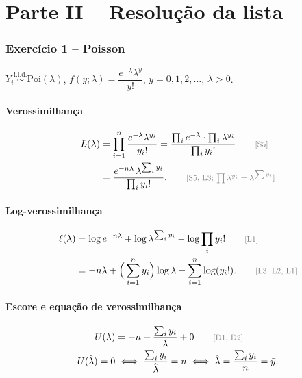 \documentclass[11pt,a4paper]{article}
\newcommand{\iid}{\overset{\text{i.i.d.}}{\sim}}
\newcommand{\just}[1]{\tag*{\footnotesize\textcolor{gray}{[#1]}}}
\theoremstyle{definition}
\theoremstyle{plain}
\begin{document}
\part*{Parte II -- Resolução da lista}
\setcounter{section}{0}

\section{Exercício 1 -- Poisson}

$Y_i\iid\text{Poi}(\lambda)$, $f(y;\lambda)=\dfrac{e^{-\lambda}\lambda^y}{y!}$, $y=0,1,2,\dots$, $\lambda>0$.

\subsection*{Verossimilhança}
\begin{align*}
L(\lambda)&=\prod_{i=1}^n\frac{e^{-\lambda}\lambda^{y_i}}{y_i!}
=\frac{\prod_ie^{-\lambda}\cdot\prod_i\lambda^{y_i}}{\prod_iy_i!} \just{S5}\\
&=\frac{e^{-n\lambda}\,\lambda^{\sum_iy_i}}{\prod_iy_i!}. \just{S5, L3; $\prod\lambda^{y_i}=\lambda^{\sum y_i}$}
\end{align*}

\subsection*{Log-verossimilhança}
\begin{align*}
\ell(\lambda)&=\log e^{-n\lambda}+\log\lambda^{\sum_iy_i}-\log\prod_iy_i! \just{L1}\\
&=-n\lambda+\Big(\sum_{i=1}^ny_i\Big)\log\lambda-\sum_{i=1}^n\log(y_i!). \just{L3, L2, L1}
\end{align*}

\subsection*{Escore e equação de verossimilhança}
\begin{align*}
U(\lambda)&=-n+\frac{\sum_iy_i}{\lambda}+0 \just{D1, D2}\\
U(\hat\lambda)=0&\iff\frac{\sum_iy_i}{\hat\lambda}=n\iff\hat\lambda=\frac{\sum_iy_i}{n}=\bar y .
\end{align*}
\end{document}
